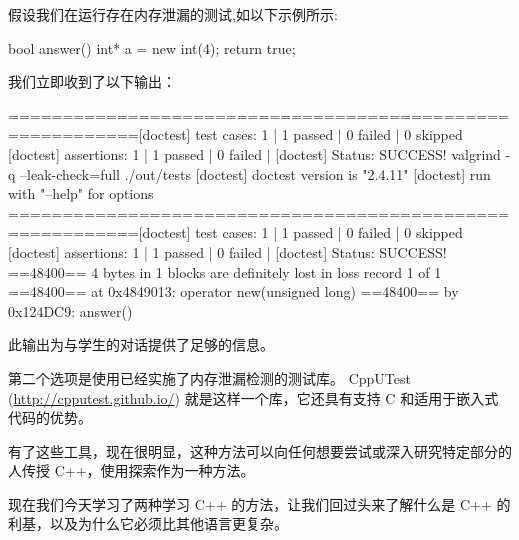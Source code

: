 假设我们在运行存在内存泄漏的测试,如以下示例所示:

\begin{cpp}
bool answer(){
  int* a = new int(4);
  return true;
}
\end{cpp}

我们立即收到了以下输出：

\begin{shell}
==========================================================[doctest]
test cases: 1 | 1 passed | 0 failed | 0 skipped
[doctest] assertions: 1 | 1 passed | 0 failed |
[doctest] Status: SUCCESS!
valgrind -q --leak-check=full ./out/tests
[doctest] doctest version is "2.4.11"
[doctest] run with "--help" for options
==========================================================[doctest]
test cases: 1 | 1 passed | 0 failed | 0 skipped
[doctest] assertions: 1 | 1 passed | 0 failed |
[doctest] Status: SUCCESS!
==48400== 4 bytes in 1 blocks are definitely lost in loss record 1 of 1
==48400== at 0x4849013: operator new(unsigned long) ==48400== by 0x124DC9: answer()
\end{shell}

此输出为与学生的对话提供了足够的信息。

第二个选项是使用已经实施了内存泄漏检测的测试库。 CppUTest (\url{http://cpputest.github.io/}) 就是这样一个库，它还具有支持 C 和适用于嵌入式代码的优势。

有了这些工具，现在很明显，这种方法可以向任何想要尝试或深入研究特定部分的人传授 C++，使用探索作为一种方法。

现在我们今天学习了两种学习 C++ 的方法，让我们回过头来了解什么是 C++ 的利基，以及为什么它必须比其他语言更复杂。














